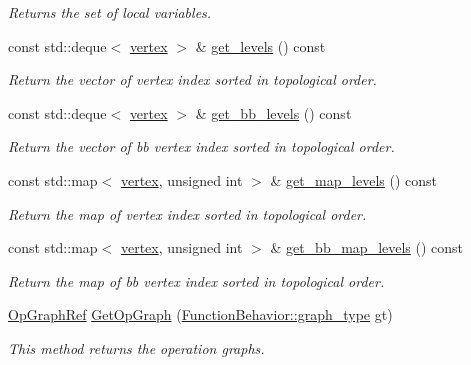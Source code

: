 \begin{DoxyCompactItemize}
\begin{DoxyCompactList}\small\item\em Returns the set of local variables. \end{DoxyCompactList}\item 
const std\+::deque$<$ \hyperlink{graph_8hpp_abefdcf0544e601805af44eca032cca14}{vertex} $>$ \& \hyperlink{classFunctionBehavior_ae5e522f19aaba808e79e309ea0fcb4e0}{get\+\_\+levels} () const
\begin{DoxyCompactList}\small\item\em Return the vector of vertex index sorted in topological order. \end{DoxyCompactList}\item 
const std\+::deque$<$ \hyperlink{graph_8hpp_abefdcf0544e601805af44eca032cca14}{vertex} $>$ \& \hyperlink{classFunctionBehavior_ad76eb3b6f53ee1ef999599f21459dd3f}{get\+\_\+bb\+\_\+levels} () const
\begin{DoxyCompactList}\small\item\em Return the vector of bb vertex index sorted in topological order. \end{DoxyCompactList}\item 
const std\+::map$<$ \hyperlink{graph_8hpp_abefdcf0544e601805af44eca032cca14}{vertex}, unsigned int $>$ \& \hyperlink{classFunctionBehavior_a7b60365fa80bdf92ca842bae4b5c49eb}{get\+\_\+map\+\_\+levels} () const
\begin{DoxyCompactList}\small\item\em Return the map of vertex index sorted in topological order. \end{DoxyCompactList}\item 
const std\+::map$<$ \hyperlink{graph_8hpp_abefdcf0544e601805af44eca032cca14}{vertex}, unsigned int $>$ \& \hyperlink{classFunctionBehavior_afe9b9b0f9c7be3f3808bf34e0050b7f3}{get\+\_\+bb\+\_\+map\+\_\+levels} () const
\begin{DoxyCompactList}\small\item\em Return the map of bb vertex index sorted in topological order. \end{DoxyCompactList}\item 
\hyperlink{op__graph_8hpp_aee97c95c40f791b60c451d9e29c72d39}{Op\+Graph\+Ref} \hyperlink{classFunctionBehavior_a7ca8776b5439e3167f9e95443ef960c2}{Get\+Op\+Graph} (\hyperlink{classFunctionBehavior_aed344711ee2798586d99f537b4b7975c}{Function\+Behavior\+::graph\+\_\+type} gt)
\begin{DoxyCompactList}\small\item\em This method returns the operation graphs. \end{DoxyCompactList}\item 

\end{DoxyCompactItemize}
